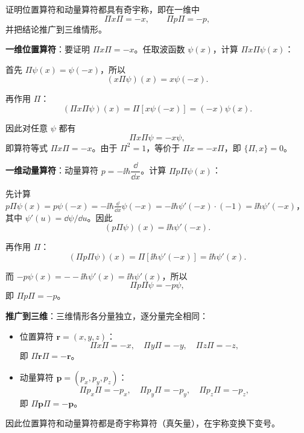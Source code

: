 \begin{question}
证明位置算符和动量算符都具有奇宇称，即在一维中
\[
\Pi x\Pi=-x,
\qquad
\Pi p\Pi=-p,
\]
并把结论推广到三维情形。
\end{question}
\begin{solution}
	\textbf{一维位置算符}：要证明 $\Pi x\Pi = -x$。任取波函数 $\psi(x)$，计算 $\Pi x\Pi\psi(x)$：

	首先 $\Pi\psi(x)=\psi(-x)$，所以
	\[
	(x\Pi\psi)(x)=x\psi(-x).
	\]

	再作用 $\Pi$：
	\[
	(\Pi x\Pi\psi)(x)=\Pi[x\psi(-x)]=(-x)\psi(x).
	\]

	因此对任意 $\psi$ 都有
	\[
	\Pi x\Pi\psi = -x\psi,
	\]
	即算符等式 $\boxed{\Pi x\Pi = -x}$。由于 $\Pi^2=1$，等价于 $\Pi x = -x\Pi$，即 $\{\Pi,x\}=0$。

	\textbf{一维动量算符}：动量算符 $p = -\ii\hbar\dfrac{\dd}{\dd x}$。计算 $\Pi p\Pi\psi(x)$：

	先计算 $p\Pi\psi(x)=p\psi(-x)=-\ii\hbar\frac{\dd}{\dd x}\psi(-x)=-\ii\hbar\psi'(-x)\cdot(-1)=\ii\hbar\psi'(-x)$，
	其中 $\psi'(u)=\dd\psi/\dd u$。因此
	\[
	(p\Pi\psi)(x)=\ii\hbar\psi'(-x).
	\]

	再作用 $\Pi$：
	\[
	(\Pi p\Pi\psi)(x)=\Pi[\ii\hbar\psi'(-x)]=\ii\hbar\psi'(x).
	\]

	而 $-p\psi(x)=--\ii\hbar\psi'(x)=\ii\hbar\psi'(x)$，所以
	\[
	\Pi p\Pi\psi = -p\psi,
	\]
	即 $\boxed{\Pi p\Pi = -p}$。

	\textbf{推广到三维}：三维情形各分量独立，逐分量完全相同：
	\begin{itemize}
	\item 位置算符 $\mathbf r=(x,y,z)$：
	\[
	\Pi x\Pi = -x,\quad \Pi y\Pi = -y,\quad \Pi z\Pi = -z,
	\]
	即 $\boxed{\Pi\mathbf r\Pi = -\mathbf r}$。
	\item 动量算符 $\mathbf p=(p_x,p_y,p_z)$：
	\[
	\Pi p_x\Pi = -p_x,\quad \Pi p_y\Pi = -p_y,\quad \Pi p_z\Pi = -p_z,
	\]
	即 $\boxed{\Pi\mathbf p\Pi = -\mathbf p}$。
	\end{itemize}

	因此位置算符和动量算符都是奇宇称算符（真矢量），在宇称变换下变号。
	\end{solution}

